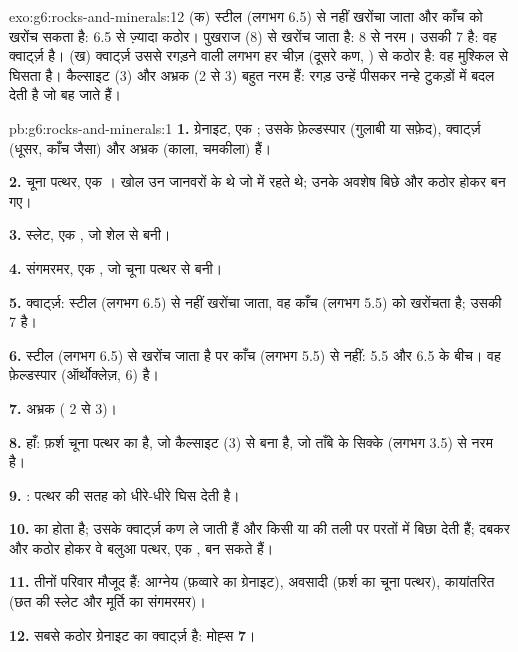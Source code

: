 \begin{solution}{exo:g6:rocks-and-minerals:12}
(क) स्टील (लगभग 6.5) से नहीं खरोंचा जाता और काँच को खरोंच सकता है: 6.5 से
ज़्यादा कठोर। पुखराज (8) से खरोंच जाता है: 8 से नरम। उसकी  7 है: वह
क्वार्ट्ज़ है। (ख) क्वार्ट्ज़ उससे रगड़ने वाली लगभग हर चीज़ (दूसरे कण, ) से कठोर
है: वह मुश्किल से घिसता है। कैल्साइट (3) और अभ्रक
(2 से 3) बहुत नरम हैं: रगड़ उन्हें पीसकर नन्हे टुकड़ों में बदल देती है जो
बह जाते हैं।
\end{solution}

\begin{solution}{pb:g6:rocks-and-minerals:1}
\textbf{1.} ग्रेनाइट, एक ; उसके  फ़ेल्डस्पार (गुलाबी या
सफ़ेद), क्वार्ट्ज़ (धूसर, काँच जैसा) और अभ्रक (काला, चमकीला) हैं।

\textbf{2.} चूना पत्थर, एक । खोल उन जानवरों के थे
जो  में रहते थे; उनके अवशेष बिछे और कठोर होकर
 बन गए।

\textbf{3.} स्लेट, एक , जो शेल से बनी।

\textbf{4.} संगमरमर, एक , जो चूना पत्थर से बनी।

\textbf{5.} क्वार्ट्ज़: स्टील (लगभग 6.5) से नहीं खरोंचा जाता, वह काँच
(लगभग 5.5) को खरोंचता है; उसकी  7 है।

\textbf{6.} स्टील (लगभग 6.5) से खरोंच जाता है पर काँच (लगभग 5.5) से नहीं:
5.5 और 6.5 के बीच। वह फ़ेल्डस्पार (ऑर्थोक्लेज़, 6) है।

\textbf{7.} अभ्रक ( 2 से 3)।

\textbf{8.} हाँ: फ़र्श चूना पत्थर का है, जो कैल्साइट (3) से बना है, जो ताँबे के
सिक्के (लगभग 3.5) से नरम है।

\textbf{9.} :  पत्थर की सतह को धीरे-धीरे घिस
देती है।

\textbf{10.}  का  होता है; उसके क्वार्ट्ज़ कण  ले जाती हैं और
किसी  या  की तली पर परतों में बिछा देती हैं; दबकर
और कठोर होकर वे बलुआ पत्थर, एक , बन सकते हैं।

\textbf{11.} तीनों परिवार मौजूद हैं: आग्नेय (फ़व्वारे का
ग्रेनाइट), अवसादी (फ़र्श का चूना पत्थर), कायांतरित (छत की
स्लेट और मूर्ति का संगमरमर)।

\textbf{12.} सबसे कठोर  ग्रेनाइट का क्वार्ट्ज़ है: मोह्स
 \textbf{7}।
\end{solution}
